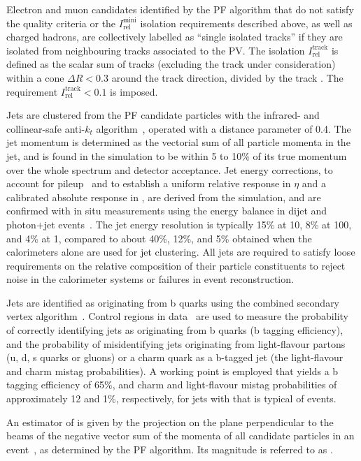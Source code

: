 Electron and muon candidates identified by the PF algorithm that do
not satisfy the quality criteria or the $I^\text{mini}_\text{rel}$
isolation requirements described above, as well as charged hadrons,
are collectively labelled as ``single isolated tracks'' if they are
isolated from neighbouring tracks associated to the
PV. The isolation $I^\text{track}_\text{rel}$ is defined as the scalar
\pt sum of tracks (excluding the track under
consideration) within a cone $\Delta R < 0.3$ around the track
direction, divided by the track \pt. The requirement
$I^\text{track}_\text{rel} < 0.1$ is imposed.

Jets are clustered from the PF candidate particles with the infrared-
and collinear-safe anti-$k_t$ algorithm~\cite{antikt}, operated with a
distance parameter of 0.4. The jet momentum is determined as the
vectorial sum of all particle momenta in the jet, and is found in the
simulation to be within 5 to 10\% of its true momentum over the whole
\pt spectrum and detector acceptance. Jet energy corrections, to
account for pileup~\cite{pileup} and to establish a uniform relative
response in $\eta$ and a calibrated absolute response in \pt, are
derived from the simulation, and are confirmed with in situ
measurements using the energy balance in dijet and photon+jet
events~\cite{Chatrchyan:2011ds}. The jet energy resolution is
typically 15\% at 10\GeV, 8\% at 100\GeV, and 4\% at 1\TeV, compared
to about 40\%, 12\%, and 5\% obtained when the calorimeters alone are
used for jet clustering.
All jets are required to satisfy loose requirements on the relative
composition of their particle constituents to reject noise in the
calorimeter systems or failures in event reconstruction.

Jets are identified as originating from b quarks using the combined
secondary vertex algorithm~\cite{CMS-PAS-BTV-12-001}. Control regions
in data~\cite{bjets} are used to measure the probability of correctly
identifying jets as originating from b quarks (b tagging efficiency),
and the probability of misidentifying jets originating from
light-flavour partons (u, d, s quarks or gluons) or a charm quark as a
b-tagged jet (the light-flavour and charm mistag probabilities). A
working point is employed that yields a b tagging efficiency of 65\%,
and charm and light-flavour mistag probabilities of approximately 12
and 1\%, respectively, for jets with \pt that is typical of \ttbar
events.

An estimator of \ptvecmiss is given by the projection on the plane
perpendicular to the beams of the negative vector sum of the momenta
of all candidate particles in an event~\cite{cms-met}, as determined
by the PF algorithm. Its magnitude is referred to as \ETmiss.

